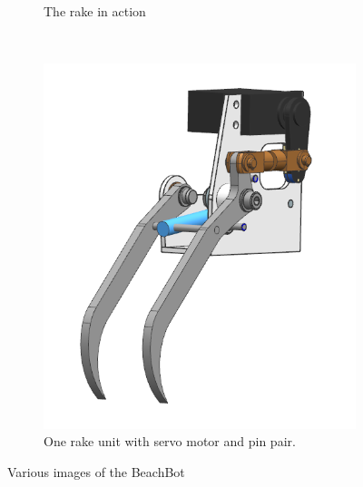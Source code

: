 \begin{figure}
\begin{subfigure}[c]{0.46\textwidth}
\caption{The rake in action}
\end{subfigure}
~~
\begin{subfigure}[c]{0.3\textwidth}
\includegraphics[width=\textwidth]{images/introduction/rake_pins.png}
\caption{One rake unit with servo motor and pin pair.}
\end{subfigure}
\caption{Various images of the BeachBot}
\label{fig:beachbot}
\end{figure} 

